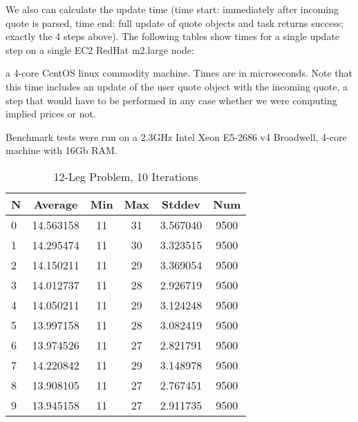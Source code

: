 \documentclass{article}
\begin{document}
We also can calculate the update time (time start: immediately after incoming quote is parsed, time end: full update of quote objects and task returns success; exactly the 4 steps above).  The following tables show times for a single update step on a single EC2 RedHat m2.large node:



a 4-core CentOS linux commodity machine. Times are in microseconds. Note that this time includes an update of the user quote object with the incoming quote, a step that would have to be performed in any case whether we were computing implied prices or not.

Benchmark tests were run on a 2.3GHz Intel Xeon E5-2686 v4 Broadwell, 4-core machine with 16Gb RAM.
 
\clearpage
\begin{table}
\centering
\begin{tabular}{|l|c|c|c|c|c|}
\hline
N & Average & Min & Max & Stddev & Num \\
\hline
0 & 14.563158 & 11 & 31 & 3.567040 & 9500 \\ 
1 & 14.295474 & 11 & 30 & 3.323515 & 9500 \\ 
2 & 14.150211 & 11 & 29 & 3.369054 & 9500 \\ 
3 & 14.012737 & 11 & 28 & 2.926719 & 9500 \\ 
4 & 14.050211 & 11 & 29 & 3.124248 & 9500 \\ 
5 & 13.997158 & 11 & 28 & 3.082419 & 9500 \\ 
6 & 13.974526 & 11 & 27 & 2.821791 & 9500 \\ 
7 & 14.220842 & 11 & 29 & 3.148978 & 9500 \\ 
8 & 13.908105 & 11 & 27 & 2.767451 & 9500 \\ 
9 & 13.945158 & 11 & 27 & 2.911735 & 9500 \\ 
\hline
\end{tabular}
\caption{12-Leg Problem, 10 Iterations}
\label{tab:template}
\end{table}
\end{document}
